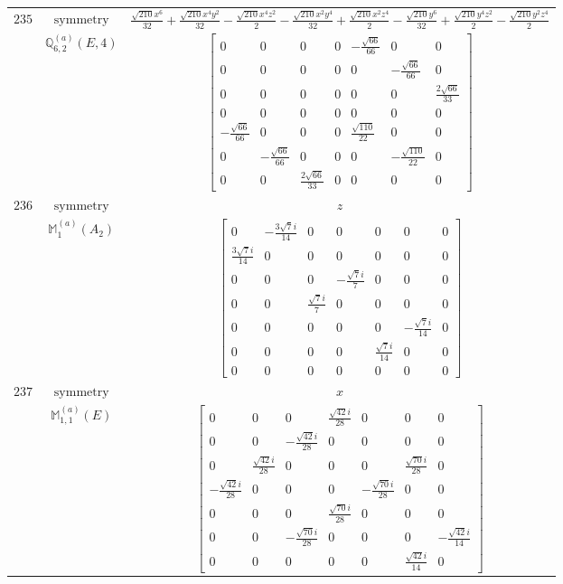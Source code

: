 \documentclass[fleqn,8pt,landscape]{jsarticle}
\begin{document}
\begin{longtable}{ccc}
$ 235 $ & $ \text{symmetry} $ & $ \frac{\sqrt{210} x^{6}}{32} + \frac{\sqrt{210} x^{4} y^{2}}{32} - \frac{\sqrt{210} x^{4} z^{2}}{2} - \frac{\sqrt{210} x^{2} y^{4}}{32} + \frac{\sqrt{210} x^{2} z^{4}}{2} - \frac{\sqrt{210} y^{6}}{32} + \frac{\sqrt{210} y^{4} z^{2}}{2} - \frac{\sqrt{210} y^{2} z^{4}}{2} $ \\
$  $ & $ \mathbb{Q}_{6,2}^{(a)}(E,4) $ & $ \begin{bmatrix} 0 & 0 & 0 & 0 & - \frac{\sqrt{66}}{66} & 0 & 0 \\ 0 & 0 & 0 & 0 & 0 & - \frac{\sqrt{66}}{66} & 0 \\ 0 & 0 & 0 & 0 & 0 & 0 & \frac{2 \sqrt{66}}{33} \\ 0 & 0 & 0 & 0 & 0 & 0 & 0 \\ - \frac{\sqrt{66}}{66} & 0 & 0 & 0 & \frac{\sqrt{110}}{22} & 0 & 0 \\ 0 & - \frac{\sqrt{66}}{66} & 0 & 0 & 0 & - \frac{\sqrt{110}}{22} & 0 \\ 0 & 0 & \frac{2 \sqrt{66}}{33} & 0 & 0 & 0 & 0 \end{bmatrix} $ \\ \hline
$ 236 $ & $ \text{symmetry} $ & $ z $ \\
$  $ & $ \mathbb{M}_{1}^{(a)}(A_{2}) $ & $ \begin{bmatrix} 0 & - \frac{3 \sqrt{7} i}{14} & 0 & 0 & 0 & 0 & 0 \\ \frac{3 \sqrt{7} i}{14} & 0 & 0 & 0 & 0 & 0 & 0 \\ 0 & 0 & 0 & - \frac{\sqrt{7} i}{7} & 0 & 0 & 0 \\ 0 & 0 & \frac{\sqrt{7} i}{7} & 0 & 0 & 0 & 0 \\ 0 & 0 & 0 & 0 & 0 & - \frac{\sqrt{7} i}{14} & 0 \\ 0 & 0 & 0 & 0 & \frac{\sqrt{7} i}{14} & 0 & 0 \\ 0 & 0 & 0 & 0 & 0 & 0 & 0 \end{bmatrix} $ \\ \hline
$ 237 $ & $ \text{symmetry} $ & $ x $ \\
$  $ & $ \mathbb{M}_{1,1}^{(a)}(E) $ & $ \begin{bmatrix} 0 & 0 & 0 & \frac{\sqrt{42} i}{28} & 0 & 0 & 0 \\ 0 & 0 & - \frac{\sqrt{42} i}{28} & 0 & 0 & 0 & 0 \\ 0 & \frac{\sqrt{42} i}{28} & 0 & 0 & 0 & \frac{\sqrt{70} i}{28} & 0 \\ - \frac{\sqrt{42} i}{28} & 0 & 0 & 0 & - \frac{\sqrt{70} i}{28} & 0 & 0 \\ 0 & 0 & 0 & \frac{\sqrt{70} i}{28} & 0 & 0 & 0 \\ 0 & 0 & - \frac{\sqrt{70} i}{28} & 0 & 0 & 0 & - \frac{\sqrt{42} i}{14} \\ 0 & 0 & 0 & 0 & 0 & \frac{\sqrt{42} i}{14} & 0 \end{bmatrix} $ \\ \hline

\end{longtable}
\end{document}
